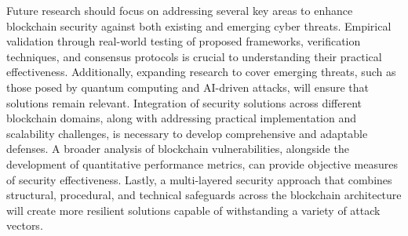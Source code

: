 \documentclass[12pt,a4paper]{article}
\begin{document}
\begin{itemize}
Future research should focus on addressing several key areas to enhance blockchain security against both existing and emerging cyber threats. Empirical validation through real-world testing of proposed frameworks, verification techniques, and consensus protocols is crucial to understanding their practical effectiveness. Additionally, expanding research to cover emerging threats, such as those posed by quantum computing and AI-driven attacks, will ensure that solutions remain relevant. Integration of security solutions across different blockchain domains, along with addressing practical implementation and scalability challenges, is necessary to develop comprehensive and adaptable defenses. A broader analysis of blockchain vulnerabilities, alongside the development of quantitative performance metrics, can provide objective measures of security effectiveness. Lastly, a multi-layered security approach that combines structural, procedural, and technical safeguards across the blockchain architecture will create more resilient solutions capable of withstanding a variety of attack vectors.

\end{itemize}

\end{document}
